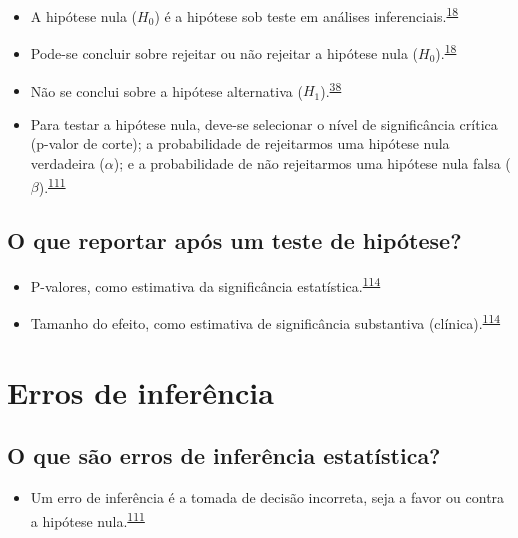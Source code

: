 \documentclass[
]{book}
\providecommand{\tightlist}{%
  \setlength{\itemsep}{0pt}\setlength{\parskip}{0pt}}
\begin{document}
\begin{itemize}
\item
  A hipótese nula (\(H_{0}\)) é a hipótese sob teste em análises inferenciais.\textsuperscript{\protect\hyperlink{ref-Ali2016}{18}}
\item
  Pode-se concluir sobre rejeitar ou não rejeitar a hipótese nula (\(H_{0}\)).\textsuperscript{\protect\hyperlink{ref-Ali2016}{18}}
\item
  Não se conclui sobre a hipótese alternativa (\(H_{1}\)).\textsuperscript{\protect\hyperlink{ref-kanji2006}{38}}
\item
  Para testar a hipótese nula, deve-se selecionar o nível de significância crítica (p-valor de corte); a probabilidade de rejeitarmos uma hipótese nula verdadeira (\(\alpha\)); e a probabilidade de não rejeitarmos uma hipótese nula falsa (\(\beta\)).\textsuperscript{\protect\hyperlink{ref-Curran-Everett2009}{111}}
\end{itemize}

\hypertarget{o-que-reportar-apuxf3s-um-teste-de-hipuxf3tese}{%
\subsection{O que reportar após um teste de hipótese?}\label{o-que-reportar-apuxf3s-um-teste-de-hipuxf3tese}}

\begin{itemize}
\item
  P-valores, como estimativa da significância estatística.\textsuperscript{\protect\hyperlink{ref-Sullivan2012}{114}}
\item
  Tamanho do efeito, como estimativa de significância substantiva (clínica).\textsuperscript{\protect\hyperlink{ref-Sullivan2012}{114}}
\end{itemize}

\hypertarget{erros-de-inferuxeancia}{%
\section{Erros de inferência}\label{erros-de-inferuxeancia}}

\hypertarget{o-que-suxe3o-erros-de-inferuxeancia-estatuxedstica}{%
\subsection{O que são erros de inferência estatística?}\label{o-que-suxe3o-erros-de-inferuxeancia-estatuxedstica}}

\begin{itemize}
\tightlist
\item
  Um erro de inferência é a tomada de decisão incorreta, seja a favor ou contra a hipótese nula.\textsuperscript{\protect\hyperlink{ref-Curran-Everett2009}{111}}
\end{itemize}
\end{document}
